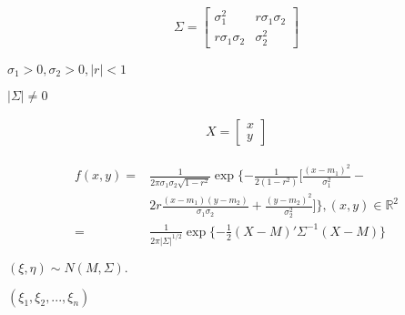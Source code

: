 \begin{preview}
\setcounter{equation}{0}%
\begin{align}
  \Sigma =
\begin{bmatrix}
\sigma_1^2&r\sigma_1\sigma_2\\
r\sigma_1\sigma_2&\sigma_2^2
\end{bmatrix}
\end{align}

\end{preview}

\begin{preview}
\setcounter{equation}{0}%
\(\sigma_1 > 0, \sigma_2 > 0, \vert r \vert < 1\)
\end{preview}

\begin{preview}
\setcounter{equation}{0}%
\(\vert \Sigma \vert \neq 0\)
\end{preview}

\begin{preview}
\setcounter{equation}{0}%
\begin{align}
  X=
\begin{bmatrix}
x\\y
\end{bmatrix}
\end{align}

\end{preview}

\begin{preview}
\setcounter{equation}{0}%
\begin{align}
  f(x, y) =& \frac{1}{2\pi \sigma_1 \sigma_2 \sqrt{1 - r^2}} \exp\{-\frac{1}{2(1-r^2)}[\frac{(x-m_1)^2}{\sigma_1^2} - \\
&2r \frac{(x-m_1)(y-m_2)}{\sigma_1 \sigma_2} + \frac{(y - m_2)^2}{\sigma_2^2}]\}, (x, y) \in \mathbb{R}^2\\
=&\frac{1}{2\pi\vert\Sigma\vert^{1/2}}\exp\{-\frac{1}{2}(X - M)' \Sigma^{-1} (X-M)\}
\end{align}

\end{preview}

\begin{preview}
\setcounter{equation}{0}%
\((\xi, \eta) \sim N(M, \Sigma).\)
\end{preview}

\begin{preview}
\setcounter{equation}{0}%
\((\xi_1, \xi_2, ..., \xi_n)\)
\end{preview}

